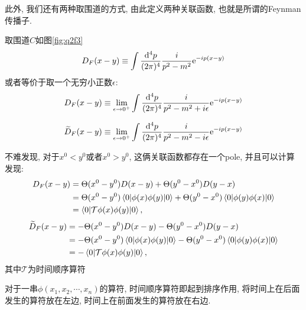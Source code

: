 此外, 我们还有两种取围道的方式, 由此定义两种关联函数, 也就是所谓的Feynman传播子.
\begin{theorem}[Feynman传播子$D_F(x-y)$]
    取围道$C$如图\ref{fig:q2f3}
    \begin{equation}
        D_F(x-y)\equiv\int\frac{\mathrm d^4p}{(2\pi)^4} \frac i{p^2-m^2}\mathrm e^{-ip(x-y)}\label{q2eq5}
    \end{equation}
    或者等价于取一个无穷小正数$\epsilon$:
    \begin{equation}
        D_F(x-y)\equiv\lim_{\epsilon\rightarrow0^+}\int\frac{\mathrm d^4p}{(2\pi)^4} \frac i{p^2-m^2+i\epsilon}\mathrm e^{-ip(x-y)}
    \end{equation}
\end{theorem}
\begin{theorem}
    \begin{equation}
        \widetilde D_F(x-y)\equiv\lim_{\epsilon\rightarrow0^+}\int\frac{\mathrm d^4p}{(2\pi)^4} \frac i{p^2-m^2-i\epsilon}\mathrm e^{-ip(x-y)}\label{q2eq6}
    \end{equation}
\end{theorem}

不难发现, 对于$x^0<y^0$或者$x^0>y^0$, 这俩关联函数都存在一个pole, 并且可以计算发现:
\begin{align}
    D_F(x-y)&=\Theta(x^0-y^0)D(x-y)+\Theta(y^0-x^0)D(y-x)\\
    &=\Theta(x^0-y^0)\braket{0|\phi(x)\phi(y)|0}+\Theta(y^0-x^0)\braket{0|\phi(y)\phi(x)|0}\\
    &=\braket{0|\mathcal T\phi(x)\phi(y)|0},
\end{align}
\begin{align}
    \widetilde D_F(x-y)&=-\Theta(x^0-y^0)D(x-y)-\Theta(y^0-x^0)D(y-x)\\
    &=-\Theta(x^0-y^0)\braket{0|\phi(x)\phi(y)|0}-\Theta(y^0-x^0)\braket{0|\phi(y)\phi(x)|0}\\
    &=-\braket{0|\mathcal T\phi(x)\phi(y)|0},
\end{align}
其中$\mathcal T$为时间顺序算符
\begin{definition}
    对于一串$\phi(x_1,x_2,\cdots,x_n)$的算符, 时间顺序算符即起到排序作用, 将时间上在后面发生的算符放在左边, 时间上在前面发生的算符放在右边.
\end{definition}

